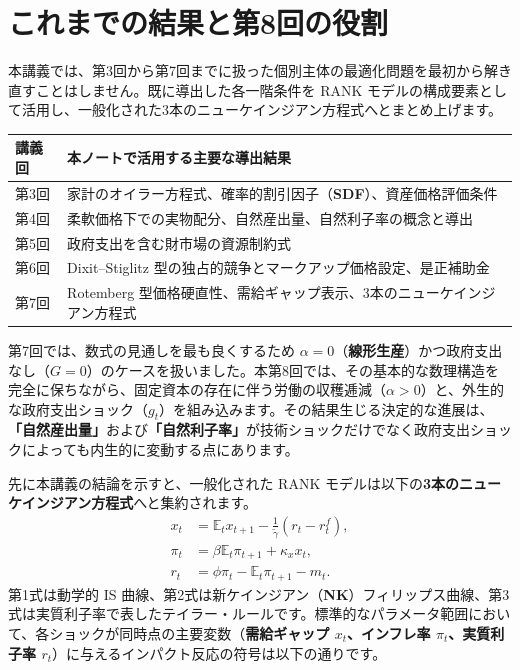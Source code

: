 \documentclass[
  japanese,
  lualatex,
  ja=standard,
  12pt,
  a4paper]{ltjsarticle}
\newcounter{none} %
\begin{document}
\section{これまでの結果と第8回の役割}\label{ux3053ux308cux307eux3067ux306eux7d50ux679cux3068ux7b2c8ux56deux306eux5f79ux5272}

本講義では、第3回から第7回までに扱った個別主体の最適化問題を最初から解き直すことはしません。既に導出した各一階条件を
RANK
モデルの構成要素として活用し、一般化された3本のニューケインジアン方程式へとまとめ上げます。

\Needspace{0.24\textheight}

{\def\LTcaptype{none} %
\begin{longtable}[]{@{}
  >{\raggedright\arraybackslash}p{}
  >{\raggedright\arraybackslash}p{}@{}}
\toprule\noalign{}
\begin{minipage}[b]{\linewidth}\raggedright
講義回
\end{minipage} & \begin{minipage}[b]{\linewidth}\raggedright
本ノートで活用する主要な導出結果
\end{minipage} \\
\midrule\noalign{}
\endhead
\bottomrule\noalign{}
\endlastfoot
第3回 &
家計のオイラー方程式、確率的割引因子（\textbf{SDF}）、資産価格評価条件 \\
第4回 & 柔軟価格下での実物配分、自然産出量、自然利子率の概念と導出 \\
第5回 & 政府支出を含む財市場の資源制約式 \\
第6回 & Dixit--Stiglitz
型の独占的競争とマークアップ価格設定、是正補助金 \\
第7回 & Rotemberg
型価格硬直性、需給ギャップ表示、3本のニューケインジアン方程式 \\
\end{longtable}
}

第7回では、数式の見通しを最も良くするため
\(\alpha=0\)（\textbf{線形生産}）かつ政府支出なし（\textbf{\(G=0\)}）のケースを扱いました。本第8回では、その基本的な数理構造を完全に保ちながら、固定資本の存在に伴う労働の収穫逓減（\textbf{\(\alpha>0\)}）と、外生的な政府支出ショック（\textbf{\(g_t\)}）を組み込みます。その結果生じる決定的な進展は、\textbf{「自然産出量」}および\textbf{「自然利子率」}が技術ショックだけでなく政府支出ショックによっても内生的に変動する点にあります。

先に本講義の結論を示すと、一般化された RANK
モデルは以下の\textbf{3本のニューケインジアン方程式}へと集約されます。
\[
\begin{aligned}
x_t
&=
\mathbb{E}_t x_{t+1}
-\frac{1}{\tilde{\gamma}}(r_t-r_t^f),\\
\pi_t
&=
\beta\mathbb{E}_t\pi_{t+1}
+\kappa_x x_t,\\
r_t
&=
\phi\pi_t-\mathbb{E}_t\pi_{t+1}-m_t.
\end{aligned}
\] 第1式は動学的 IS
曲線、第2式は新ケインジアン（\textbf{NK}）フィリップス曲線、第3式は実質利子率で表したテイラー・ルールです。標準的なパラメータ範囲において、各ショックが同時点の主要変数（\textbf{需給ギャップ
\(x_t\)、インフレ率 \(\pi_t\)、実質利子率
\(r_t\)}）に与えるインパクト反応の符号は以下の通りです。
\end{document}
